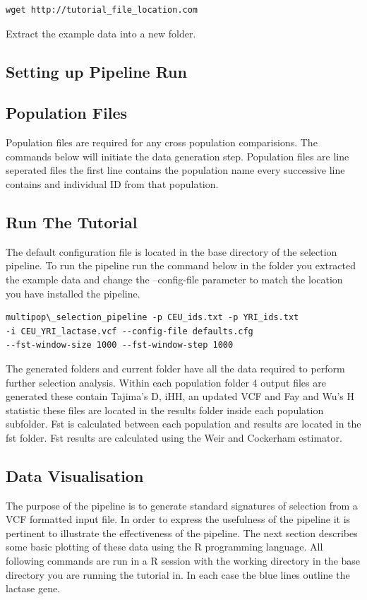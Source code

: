 \documentclass[a4paper,10pt]{article}
\begin{document}
\begin{verbatim}
wget http://tutorial_file_location.com 
\end{verbatim}

Extract the example data into a new folder.

\subsection{Setting up Pipeline Run}
\subsection{Population Files}
Population files are required for any cross population comparisions. The commands below will initiate the data generation step. Population files are line seperated files the first line contains the population name every successive line contains and individual ID from that population.\\
\subsection{Run The Tutorial}
The default configuration file is located in the base directory of the selection pipeline. To run the pipeline run the command below in the folder you extracted the example data and change the --config-file parameter to match the location you have installed the pipeline.\\
\begin{verbatim}
multipop\_selection_pipeline -p CEU_ids.txt -p YRI_ids.txt 
-i CEU_YRI_lactase.vcf --config-file defaults.cfg
--fst-window-size 1000 --fst-window-step 1000
\end{verbatim}
The generated folders and current folder have all the data required to perform further selection analysis. Within each population folder 4 output files are generated these contain Tajima's D, iHH, an updated VCF and Fay and Wu's H statistic these files are located in the results folder inside each population subfolder. Fst is calculated between each population and results are located in the fst folder. Fst results are calculated using the Weir and Cockerham estimator.
\subsection{Data Visualisation}
The purpose of the pipeline is to generate standard signatures of selection from a VCF formatted input file. In order to express the usefulness of the pipeline it is pertinent to illustrate the effectiveness of the pipeline. The next section describes some basic plotting of these data using the R programming language. All following commands are run in a R session with the working directory in the base directory you are running the tutorial in. In each case the blue lines outline the lactase gene.
\end{document}
